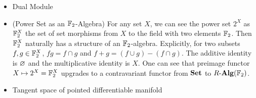 \begin{eg}
\begin{itemize}
    \item  Dual Module
  
    \item (Power Set as an $\mathbb{F}_2$-Algebra)
    For any set $X$, we can see the power set $2^X$ as $\mathbb{F}_2^X$
    the set of set morphisms from $X$ to the field with two elements $\mathbb{F}_2$.
    Then $\mathbb{F}_2^X$ naturally has a structure of an $\mathbb{F}_2$-algebra.
    Explicitly, for two subsets $f, g \in \mathbb{F}_2^X$,
    $f g = f \cap g$ and $f + g = (f \cup g) \minus (f \cap g)$.
    The additive identity is $\varnothing$ and the multiplicative identity is $X$.
    One can see that preimage functor $X \mapsto 2^X = \mathbb{F}_2^X$
    upgrades to a contravariant functor from $\mathbf{Set}$ to $R\text{-}\mathbf{Alg}(\mathbb{F}_2)$.

    \item  Tangent space of pointed differentiable manifold
  \end{itemize}
\end{eg}